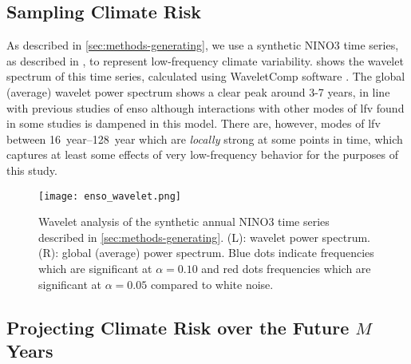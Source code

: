 \documentclass[
  draft,
  linenumbers
]{agujournal2018}
\begin{document}
\subsection{Sampling Climate Risk}\label{sec:supp-nino-spectrum}

As described in \cref{sec:methods-generating}, we use a synthetic NINO3 time series, as described in \citep{Ramesh:2016hf}, to represent low-frequency climate variability.
 shows the wavelet spectrum of this time series, calculated using WaveletComp software \citep{Roesch:wlBQQoIs}.
The global (average) wavelet power spectrum shows a clear peak around 3-7 years, in line with previous studies of \gls{enso} although interactions with other modes of \acrfull{lfv} found in some studies \citep{Jin:1994wq} is dampened in this model.
There are, however, modes of \gls{lfv} between \SIrange{16}{128}{year} which are \emph{locally} strong at some points in time, which captures at least some effects of very low-frequency behavior for the purposes of this study.
\begin{figure}
  \texttt{[image: enso\_wavelet.png]}
  \caption{
    Wavelet analysis of the synthetic annual NINO3 time series described in \cref{sec:methods-generating}.
    (L): wavelet power spectrum.
    (R): global (average) power spectrum.
    Blue dots indicate frequencies which are significant at $\alpha=0.10$ and red dots frequencies which are significant at $\alpha=0.05$ compared to white noise.
  }\label{fig:enso-ts}
\end{figure}

\subsection{Projecting Climate Risk over the Future $M$ Years}
\end{document}
